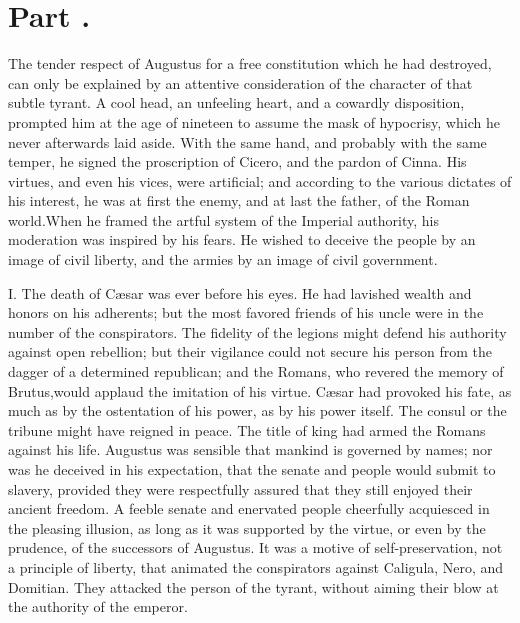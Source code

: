 \section{Part \thesection.}
\thispagestyle{simple}

The tender respect of Augustus for a free constitution which he
had destroyed, can only be explained by an attentive
consideration of the character of that subtle tyrant. A cool
head, an unfeeling heart, and a cowardly disposition, prompted
him at the age of nineteen to assume the mask of hypocrisy, which
he never afterwards laid aside. With the same hand, and probably
with the same temper, he signed the proscription of Cicero, and
the pardon of Cinna. His virtues, and even his vices, were
artificial; and according to the various dictates of his
interest, he was at first the enemy, and at last the father, of
the Roman world.\footnotemark[26] When he framed the artful system of the
Imperial authority, his moderation was inspired by his fears. He
wished to deceive the people by an image of civil liberty, and
the armies by an image of civil government.


I. The death of Cæsar was ever before his eyes. He had lavished
wealth and honors on his adherents; but the most favored friends
of his uncle were in the number of the conspirators. The fidelity
of the legions might defend his authority against open rebellion;
but their vigilance could not secure his person from the dagger
of a determined republican; and the Romans, who revered the
memory of Brutus,\footnotemark[27] would applaud the imitation of his virtue.
Cæsar had provoked his fate, as much as by the ostentation of his
power, as by his power itself. The consul or the tribune might
have reigned in peace. The title of king had armed the Romans
against his life. Augustus was sensible that mankind is governed
by names; nor was he deceived in his expectation, that the senate
and people would submit to slavery, provided they were
respectfully assured that they still enjoyed their ancient
freedom. A feeble senate and enervated people cheerfully
acquiesced in the pleasing illusion, as long as it was supported
by the virtue, or even by the prudence, of the successors of
Augustus. It was a motive of self-preservation, not a principle
of liberty, that animated the conspirators against Caligula,
Nero, and Domitian. They attacked the person of the tyrant,
without aiming their blow at the authority of the emperor.

